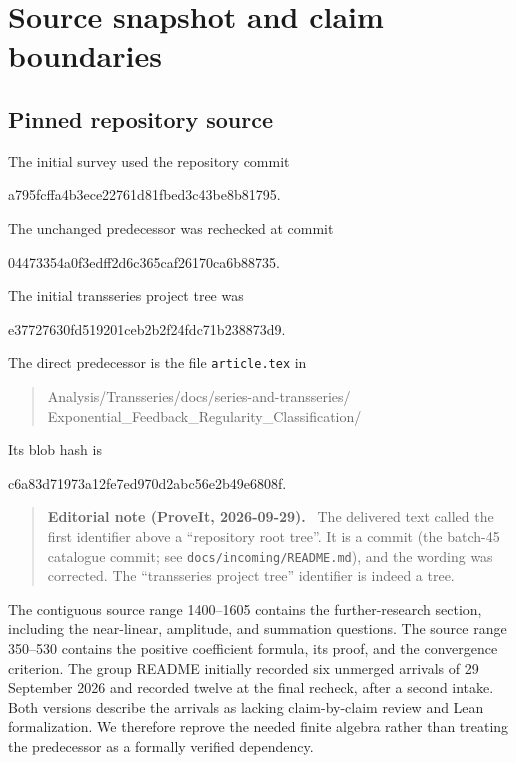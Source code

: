 \documentclass[11pt,a4paper]{article}
\numberwithin{equation}{section}
\theoremstyle{definition}
\theoremstyle{remark}
\newenvironment{ednote}{\par\smallskip\begin{quote}\small\raggedright\textbf{Editorial note (ProveIt, 2026-09-29).}\ }{\end{quote}\smallskip}
\begin{document}
\appendix
\section{Source snapshot and claim boundaries}
\label{app:sources}

\subsection{Pinned repository source}
The initial survey used the repository commit
\begin{center}\small\ttfamily
 a795fcffa4b3ece22761d81fbed3c43be8b81795.
\end{center}
The unchanged predecessor was rechecked at commit
\begin{center}\small\ttfamily
04473354a0f3edff2d6c365caf26170ca6b88735.
\end{center}
The initial transseries project tree was
\begin{center}\small\ttfamily
 e37727630fd519201ceb2b2f24fdc71b238873d9.
\end{center}
The direct predecessor is the file \texttt{article.tex} in
\begin{quote}\small\ttfamily\raggedright
Analysis/Transseries/docs/series-and-transseries/\\
Exponential\_Feedback\_Regularity\_Classification/
\end{quote}
Its blob hash is
\begin{center}\small\ttfamily
 c6a83d71973a12fe7ed970d2abc56e2b49e6808f.
\end{center}
\begin{ednote}
The delivered text called the first identifier above a ``repository root
tree''. It is a commit (the batch-45 catalogue commit; see
\nolinkurl{docs/incoming/README.md}), and the wording was corrected. The
``transseries project tree'' identifier is indeed a tree.
\end{ednote}
The contiguous source range 1400--1605 contains the further-research
section, including the near-linear, amplitude, and summation questions.
The source range 350--530 contains the positive coefficient formula,
its proof, and the convergence criterion. The group README initially
recorded six unmerged arrivals of 29 September 2026 and recorded twelve
at the final recheck, after a second intake. Both versions describe the
arrivals as lacking claim-by-claim review and Lean formalization.
We therefore reprove the needed finite algebra rather than treating the
predecessor as a formally verified dependency.
\end{document}
